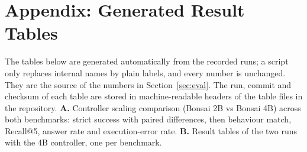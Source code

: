 \clearpage
\appendix
\section*{Appendix: Generated Result Tables}
The tables below are generated automatically from the recorded runs; a script only replaces internal names by plain labels, and every number is unchanged. They are the source of the numbers in Section~\ref{sec:eval}. The run, commit and checksum of each table are stored in machine-readable headers of the table files in the repository. \textbf{A.} Controller scaling comparison (Bonsai 2B vs Bonsai 4B) across both benchmarks: strict success with paired differences, then behaviour match, Recall@5, answer rate and execution-error rate. \textbf{B.} Result tables of the two runs with the 4B controller, one per benchmark.\par\medskip
\begingroup\makeatletter\renewcommand{}\makeatother
{}
\endgroup
{}
